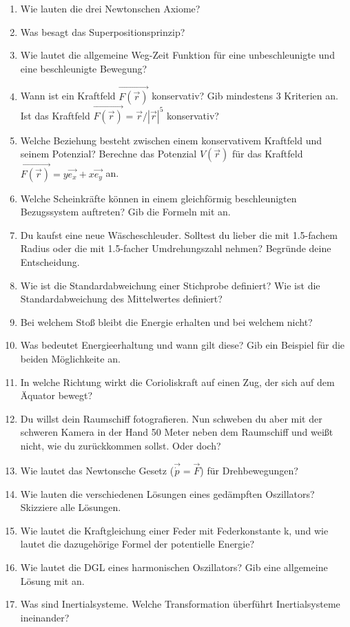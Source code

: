 




\begin{enumerate}
  \item Wie lauten die drei Newtonschen Axiome?
  \item Was besagt das Superpositionsprinzip?
  \item Wie lautet die allgemeine Weg-Zeit Funktion für eine unbeschleunigte
  und eine beschleunigte Bewegung?
  \item Wann ist ein Kraftfeld $\vec{F(\vec{r})}$ konservativ? Gib mindestens 3 Kriterien
  an. Ist das Kraftfeld $\vec{F(\vec{r})} = \vec{r}/|\vec{r}|^5$ konservativ?
  \item Welche Beziehung besteht zwischen einem konservativem Kraftfeld und seinem
  Potenzial? Berechne das Potenzial $V(\vec{r})$ für das Kraftfeld $\vec{F(\vec{r})}
  = y\vec{e_x} + x\vec{e_y}$ an.
  \item Welche Scheinkräfte können in einem gleichförmig beschleunigten Bezugssystem
  auftreten? Gib die Formeln mit an.
  \item Du kaufst eine neue Wäscheschleuder. Solltest du lieber die mit 1.5-fachem
  Radius oder die mit 1.5-facher Umdrehungszahl nehmen? Begründe deine Entscheidung.
  \item Wie ist die Standardabweichung einer Stichprobe definiert? Wie ist die
  Standardabweichung des Mittelwertes definiert?
  \item Bei welchem Stoß bleibt die Energie erhalten und bei welchem nicht?
  \item Was bedeutet Energieerhaltung und wann gilt diese? Gib ein Beispiel für
  die beiden Möglichkeite an.
  \item In welche Richtung wirkt die Corioliskraft auf einen Zug, der sich auf
  dem Äquator bewegt?
  \item Du willst dein Raumschiff fotografieren. Nun schweben du aber mit der
  schweren Kamera in der Hand 50 Meter neben dem Raumschiff und weißt nicht, wie
  du zurückkommen sollst. Oder doch?
  \item Wie lautet das Newtonsche Gesetz ($\vec{\dot{p}} = \vec{F}$) für Drehbewegungen?
  \item Wie lauten die verschiedenen Lösungen eines gedämpften Oszillators?
  Skizziere alle Lösungen.
  \item Wie lautet die Kraftgleichung einer Feder mit Federkonstante k,
  und wie lautet die dazugehörige Formel der potentielle Energie?
  \item Wie lautet die DGL eines harmonischen Oszillators? Gib eine allgemeine
  Lösung mit an.
  \item Was sind Inertialsysteme. Welche Transformation überführt Inertialsysteme
  ineinander?
\end{enumerate}


